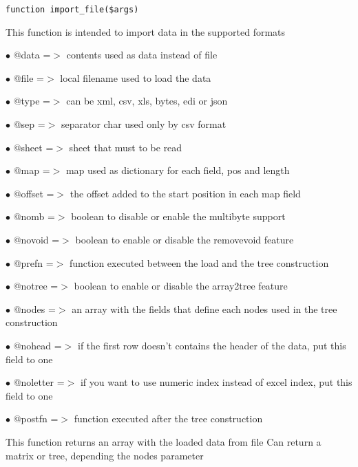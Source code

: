 \documentclass[a4paper]{book}
\begin{document}
\begin{lstlisting}
function import_file($args)
\end{lstlisting}

This function is intended to import data in the supported formats

\begin{compactitem}
\item[\color{myblue}$\bullet$] @data     =$>$ contents used as data instead of file
\item[\color{myblue}$\bullet$] @file     =$>$ local filename used to load the data
\item[\color{myblue}$\bullet$] @type     =$>$ can be xml, csv, xls, bytes, edi or json
\item[\color{myblue}$\bullet$] @sep      =$>$ separator char used only by csv format
\item[\color{myblue}$\bullet$] @sheet    =$>$ sheet that must to be read
\item[\color{myblue}$\bullet$] @map      =$>$ map used as dictionary for each field, pos and length
\item[\color{myblue}$\bullet$] @offset   =$>$ the offset added to the start position in each map field
\item[\color{myblue}$\bullet$] @nomb     =$>$ boolean to disable or enable the multibyte support
\item[\color{myblue}$\bullet$] @novoid   =$>$ boolean to enable or disable the removevoid feature
\item[\color{myblue}$\bullet$] @prefn    =$>$ function executed between the load and the tree construction
\item[\color{myblue}$\bullet$] @notree   =$>$ boolean to enable or disable the array2tree feature
\item[\color{myblue}$\bullet$] @nodes    =$>$ an array with the fields that define each nodes used in the tree construction
\item[\color{myblue}$\bullet$] @nohead   =$>$ if the first row doesn't contains the header of the data, put this field to one
\item[\color{myblue}$\bullet$] @noletter =$>$ if you want to use numeric index instead of excel index, put this field to one
\item[\color{myblue}$\bullet$] @postfn   =$>$ function executed after the tree construction
\end{compactitem}

This function returns an array with the loaded data from file
Can return a matrix or tree, depending the nodes parameter
\end{document}

